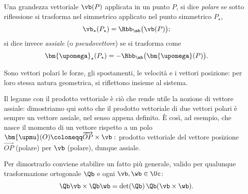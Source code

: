 \medskip


	Una grandezza vettoriale $\vb(P)$ applicata in un punto $P$, si dice \emph{polare}
	se sotto riflessione si trasforma nel simmetrico applicato nel punto
	simmetrico $P_\star$,
	\begin{equation}
		\vb_\star(P_\star) = \Rbb_{\nb}\bigl(\vb(P)\bigr);
	\end{equation}
	si dice invece \emph{assiale} (o \emph{pseudovettore})
	se si trasforma come
	\begin{equation}\label{eq:rif_assiale}
		\bm{\upomega}_\star(P_\star) = -\Rbb_{\nb}\bigl(\bm{\upomega}(P)\bigr).
	\end{equation}


Sono vettori polari le forze, gli spostamenti, le velocità e i vettori
posizione: per loro stessa natura geometrica, si riflettono insieme al
sistema.

\medskip

Il legame con il prodotto vettoriale  è ciò che rende
utile la nozione di vettore assiale: dimostriamo qui sotto
che il prodotto vettoriale di due
vettori polari è sempre un vettore assiale, nel senso appena definito. È
così, ad esempio, che nasce il momento di un vettore rispetto a un polo
$
	\bm{\upmu}(O)\coloneqq\overrightarrow{OP}\times\vb:
$
prodotto vettoriale del vettore posizione $\overrightarrow{OP}$ (polare)
per $\vb$ (polare), dunque assiale.

Per dimostrarlo conviene stabilire un fatto più generale, valido per
qualunque trasformazione ortogonale  $\Qb$  e ogni
	$\vb,\wb\in\Uc$:
	\begin{equation}\label{eq:trasf_prod_vett}
		\Qb\vb\times\Qb\wb=\det(\Qb)\,\Qb(\vb\times\wb).
	\end{equation}


